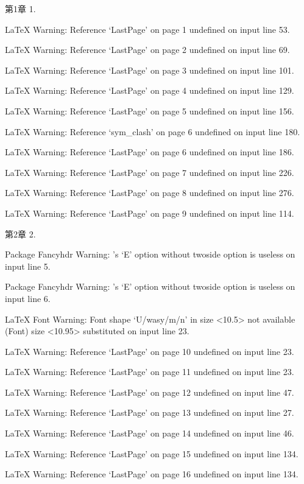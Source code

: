 第\nobreakspace {}1\nobreakspace {}章 1.

LaTeX Warning: Reference `LastPage' on page 1 undefined on input line 53.


LaTeX Warning: Reference `LastPage' on page 2 undefined on input line 69.


LaTeX Warning: Reference `LastPage' on page 3 undefined on input line 101.


LaTeX Warning: Reference `LastPage' on page 4 undefined on input line 129.


LaTeX Warning: Reference `LastPage' on page 5 undefined on input line 156.


LaTeX Warning: Reference `sym_clash' on page 6 undefined on input line 180.


LaTeX Warning: Reference `LastPage' on page 6 undefined on input line 186.


LaTeX Warning: Reference `LastPage' on page 7 undefined on input line 226.


LaTeX Warning: Reference `LastPage' on page 8 undefined on input line 276.


LaTeX Warning: Reference `LastPage' on page 9 undefined on input line 114.

第\nobreakspace {}2\nobreakspace {}章 2.

Package Fancyhdr Warning: \fancyhead's `E' option without twoside option is useless on input line 5.


Package Fancyhdr Warning: \fancyhead's `E' option without twoside option is useless on input line 6.


LaTeX Font Warning: Font shape `U/wasy/m/n' in size <10.5> not available
(Font)              size <10.95> substituted on input line 23.


LaTeX Warning: Reference `LastPage' on page 10 undefined on input line 23.


LaTeX Warning: Reference `LastPage' on page 11 undefined on input line 23.


LaTeX Warning: Reference `LastPage' on page 12 undefined on input line 47.


LaTeX Warning: Reference `LastPage' on page 13 undefined on input line 27.


LaTeX Warning: Reference `LastPage' on page 14 undefined on input line 46.


LaTeX Warning: Reference `LastPage' on page 15 undefined on input line 134.


LaTeX Warning: Reference `LastPage' on page 16 undefined on input line 134.


